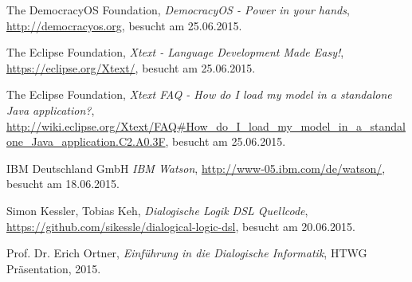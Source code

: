 \documentclass[11pt,a4paper,bibtotocnumbered]{scrreprt}
\begin{document}
\begin{singlespace}
\begin{thebibliography}{9}


  The DemocracyOS Foundation,
  \emph{DemocracyOS - Power in your hands},
  \url{http://democracyos.org},
  besucht am 25.06.2015.

  The Eclipse Foundation,
  \emph{Xtext - Language Development Made Easy!},
  \url{https://eclipse.org/Xtext/},
  besucht am 25.06.2015.
  
  The Eclipse Foundation,
  \emph{Xtext FAQ - How do I load my model in a standalone Java application?},
  \url{http://wiki.eclipse.org/Xtext/FAQ#How_do_I_load_my_model_in_a_standalone_Java_application.C2.A0.3F},
  besucht am 25.06.2015.
  
  IBM Deutschland GmbH
  \emph{IBM Watson},
  \url{http://www-05.ibm.com/de/watson/},
  besucht am 18.06.2015.
  
  
  Simon Kessler, Tobias Keh,
  \emph{Dialogische Logik DSL Quellcode},
  \url{https://github.com/sikessle/dialogical-logic-dsl},
  besucht am 20.06.2015.

  Prof. Dr. Erich Ortner,
  \emph{Einf{\"u}hrung in die Dialogische Informatik},
  HTWG Präsentation,
  2015.


\end{thebibliography}
\end{singlespace}
\end{document}
